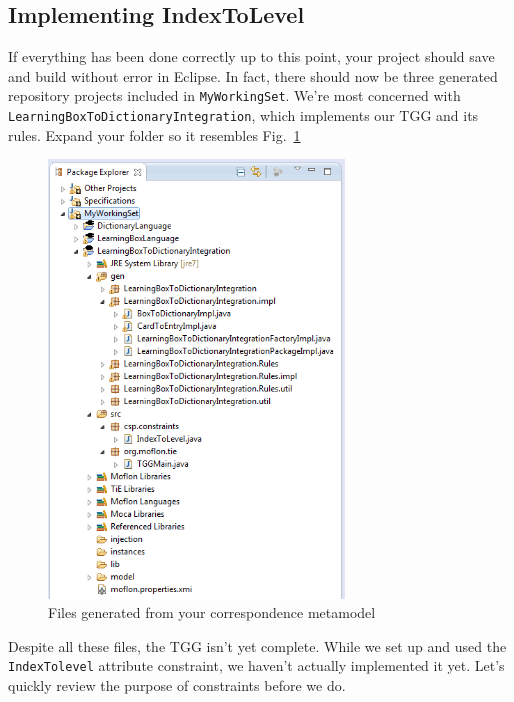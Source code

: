 \newpage
\hypertarget{rules common}{}
\subsection{Implementing IndexToLevel}
\genHeader

If everything has been done correctly up to this point, your project should save and build without error in Eclipse. In fact, there should now be three
generated repository projects included in \texttt{MyWorkingSet}. We're most concerned with \texttt{LearningBox\-To\-Dictionary\-Integration}, which implements
our TGG and its rules. Expand your folder so it resembles Fig.~\ref{fig:tggGenerated}


\begin{figure}[htbp]
\begin{center}
  \includegraphics[width=0.7\textwidth]{eclipse_generatedTGG}
  \caption{Files generated from your correspondence metamodel}
  \label{fig:tggGenerated}
\end{center}
\end{figure}

Despite all these files, the TGG isn't yet complete. While we set up and used the \texttt{IndexTolevel} attribute constraint, we haven't actually
implemented it yet. Let's quickly review the purpose of constraints before we do.

